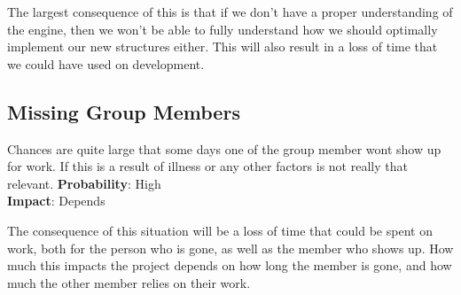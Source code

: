 The largest consequence of this is that if we don't have a proper understanding of the engine,
then we won't be able to fully understand how we should optimally implement our new structures either.
This will also result in a loss of time that we could have used on development.

\subsection*{Missing Group Members}
Chances are quite large that some days one of the group member wont show up for work.
If this is a result of illness or any other factors is not really that relevant.
\textbf{Probability}: High\\
\textbf{Impact}: Depends

The consequence of this situation will be a loss of time that could be spent on work, 
both for the person who is gone, as well as the member who shows up.
How much this impacts the project depends on how long the member is gone,
and how much the other member relies on their work.
